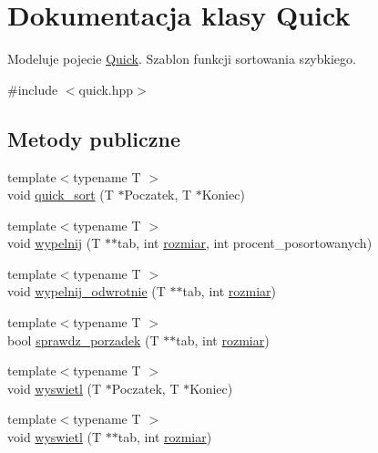 \hypertarget{class_quick}{\section{\-Dokumentacja klasy \-Quick}
\label{class_quick}
}


\-Modeluje pojecie \hyperlink{class_quick}{\-Quick}. \-Szablon funkcji sortowania szybkiego.  




{\ttfamily \#include $<$quick.\-hpp$>$}

\subsection*{\-Metody publiczne}
\begin{DoxyCompactItemize}
\item 
{\footnotesize template$<$typename T $>$ }\\void \hyperlink{class_quick_a9104bc671992e64990dedf60c0dd6993}{quick\-\_\-sort} (\-T $\ast$\-Poczatek, \-T $\ast$\-Koniec)
\item 
{\footnotesize template$<$typename T $>$ }\\void \hyperlink{class_quick_aad4bc8adc3139667f2edaa1e46993b6e}{wypelnij} (\-T $\ast$$\ast$tab, int \hyperlink{sort__benchmark_8cpp_a7a94022ad844ead66e9b80459dabdb02}{rozmiar}, int procent\-\_\-posortowanych)
\item 
{\footnotesize template$<$typename T $>$ }\\void \hyperlink{class_quick_a6029457895c0ec57c016c57be5bac0f1}{wypelnij\-\_\-odwrotnie} (\-T $\ast$$\ast$tab, int \hyperlink{sort__benchmark_8cpp_a7a94022ad844ead66e9b80459dabdb02}{rozmiar})
\item 
{\footnotesize template$<$typename T $>$ }\\bool \hyperlink{class_quick_abca7e1fcc40e88d337d81aeac1d98184}{sprawdz\-\_\-porzadek} (\-T $\ast$$\ast$tab, int \hyperlink{sort__benchmark_8cpp_a7a94022ad844ead66e9b80459dabdb02}{rozmiar})
\item 
{\footnotesize template$<$typename T $>$ }\\void \hyperlink{class_quick_a407bd1912126105f6116393e7676fc05}{wyswietl} (\-T $\ast$\-Poczatek, \-T $\ast$\-Koniec)
\item 
{\footnotesize template$<$typename T $>$ }\\void \hyperlink{class_quick_ab05c6bf9a4fe9d0ed6f83ee02c401ab9}{wyswietl} (\-T $\ast$$\ast$tab, int \hyperlink{sort__benchmark_8cpp_a7a94022ad844ead66e9b80459dabdb02}{rozmiar})
\end{DoxyCompactItemize}



